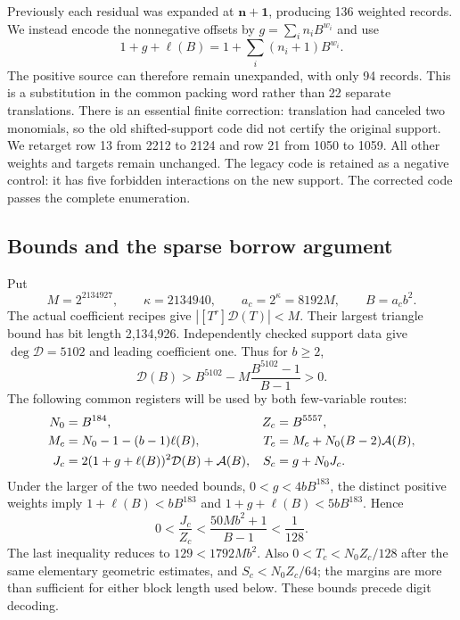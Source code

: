 \documentclass[11pt,a4paper]{article}
\theoremstyle{definition}\newtheorem{definition}[theorem]{Definition}
\theoremstyle{remark}\newtheorem{remark}[theorem]{Remark}
\begin{document}
Previously each residual was expanded at $\mathbf n+\mathbf1$, producing
136 weighted records. We instead encode the nonnegative offsets by
$g=\sum_i n_iB^{w_i}$ and use
\begin{equation}\label{eq:word-shift}
 1+g+\ell(B)=1+\sum_i(n_i+1)B^{w_i}.
\end{equation}
The positive source can therefore remain unexpanded, with only 94 records.
This is a substitution in the common packing word rather than 22 separate
translations. There is an essential finite correction: translation had
canceled two monomials, so the old shifted-support code did not certify the
original support. We retarget row 13 from 2212 to 2124 and row 21 from 1050
to 1059. All other weights and targets remain unchanged. The legacy code
is retained as a negative control: it has five forbidden interactions on
the new support. The corrected code passes the complete enumeration.

\subsection{Bounds and the sparse borrow argument}

Put
\[
 M=2^{2134927},\qquad \kappa=2134940,\qquad a_c=2^\kappa=8192M,
 \qquad B=a_cb^2.
\]
The actual coefficient recipes give $|[T^r]\mathcal D(T)|<M$. Their largest
triangle bound has bit length 2,134,926. Independently checked support data
give $\deg\mathcal D=5102$ and leading coefficient one. Thus for $b\ge2$,
\[
 \mathcal D(B)>B^{5102}-M\frac{B^{5102}-1}{B-1}>0.
\]
The following common registers will be used by both few-variable routes:
\begin{align}
 N_0&=B^{184},& Z_c&=B^{5557},\notag\\
 M_c&=N_0-1-(b-1)\ell(B),&
 T_c&=M_c+N_0(B-2)\mathcal A(B),\label{eq:source-registers}\\
 J_c&=2(1+g+\ell(B))^2\mathcal D(B)+\mathcal A(B),&
 S_c&=g+N_0J_c.\notag
\end{align}
Under the larger of the two needed bounds, $0<g<4bB^{183}$,
the distinct positive weights imply $1+\ell(B)<bB^{183}$ and
$1+g+\ell(B)<5bB^{183}$. Hence
\[
 0<\frac{J_c}{Z_c}
 <\frac{50Mb^2+1}{B-1}<\frac1{128}.
\]
The last inequality reduces to $129<1792Mb^2$. Also
$0<T_c<N_0Z_c/128$ after the same elementary geometric estimates, and
$S_c<N_0Z_c/64$; the margins are more than sufficient for either block
length used below. These bounds precede digit decoding.
\end{document}
